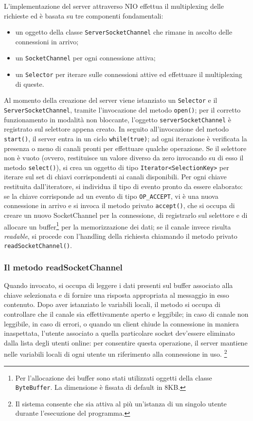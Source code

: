 \documentclass{article}
\begin{document}
L'implementazione del server attraverso NIO effettua il multiplexing delle richieste ed è basata su tre componenti fondamentali: 
\begin{itemize}
    \item un oggetto della classe \texttt{ServerSocketChannel} che rimane in ascolto delle connessioni in arrivo;
    \item un \texttt{SocketChannel} per ogni connessione attiva;
    \item un \texttt{Selector} per iterare sulle connessioni attive ed effettuare il multiplexing di queste.
\end{itemize}
Al momento della creazione del server viene istanziato un \texttt{Selector} e il \texttt{ServerSocketChannel}, tramite l'invocazione del metodo \texttt{open()}; per il corretto funzionamento in modalità non bloccante, l'oggetto \texttt{serverSocketChannel} è registrato sul selettore appena creato. In seguito all'invocazione del metodo \texttt{start()}, il server entra in un ciclo \texttt{while(true)}; ad ogni iterazione è verificata la presenza o meno di canali pronti per effettuare qualche operazione. Se il selettore non è vuoto (ovvero, restituisce un valore diverso da zero invocando su di esso il metodo \texttt{select()}), si crea un oggetto di tipo \texttt{Iterator<SelectionKey>} per iterare sul set di chiavi corrispondenti ai canali disponibili. Per ogni chiave restituita dall'iteratore, si individua il tipo di evento pronto da essere elaborato: se la chiave corrisponde ad un evento di tipo \texttt{OP\_ACCEPT}, vi è una nuova connessione in arrivo e si invoca il metodo privato \texttt{accept()}, che si occupa di creare un nuovo SocketChannel per la connessione, di registrarlo sul selettore e di allocare un buffer\footnote{Per l'allocazione dei buffer sono stati utilizzati oggetti della classe \texttt{ByteBuffer}. La dimensione è fissata di default in 8KB.} per la memorizzazione dei dati; se il canale invece risulta \emph{readable}, si procede con l'handling della richiesta chiamando il metodo privato \texttt{readSocketChannel()}.

\subsubsection{Il metodo readSocketChannel}
Quando invocato, si occupa di leggere i dati presenti sul buffer associato alla chiave selezionata e di fornire una risposta appropriata al messaggio in esso contenuto. Dopo aver istanziato le variabili locali, il metodo si occupa di controllare che il canale sia effettivamente aperto e leggibile; in caso di canale non leggibile, in caso di errori, o quando un client chiude la connessione in maniera inaspettata, l'utente associato a quella particolare socket dev'essere eliminato dalla lista degli utenti online: per consentire questa operazione, il server mantiene nelle variabili locali di ogni utente un riferimento alla connessione in uso. \footnote{Il sistema consente che sia attiva al più un'istanza di un singolo utente durante l'esecuzione del programma.}
\end{document}

